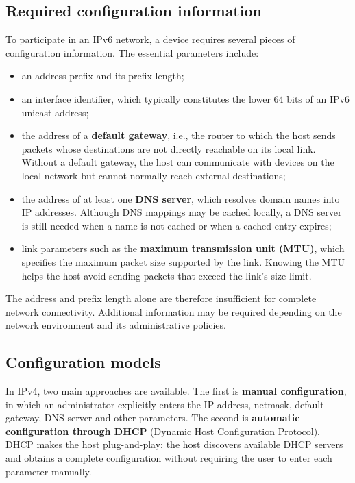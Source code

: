 \documentclass[11pt,a4paper,openany]{report}
\begin{document}
\subsection{Required configuration information}

To participate in an IPv6 network, a device requires several pieces of
configuration information. The essential parameters include:

\begin{itemize}
	\item an address prefix and its prefix length;
	\item an interface identifier, which typically constitutes the lower
	64 bits of an IPv6 unicast address;
	\item the address of a \textbf{default gateway}, i.e., the router to which
	the host sends packets whose destinations are not directly reachable
	on its local link. Without a default gateway, the host can communicate
	with devices on the local network but cannot normally reach external
	destinations;
	\item the address of at least one \textbf{DNS server}, which resolves
	domain names into IP addresses. Although DNS mappings may be cached
	locally, a DNS server is still needed when a name is not cached or
	when a cached entry expires;
	\item link parameters such as the \textbf{maximum transmission unit
		(MTU)}, which specifies the maximum packet size supported by the link.
	Knowing the MTU helps the host avoid sending packets that exceed the
	link's size limit.
\end{itemize}

The address and prefix length alone are therefore insufficient for
complete network connectivity. Additional information may be required
depending on the network environment and its administrative policies.


\subsection{Configuration models}

In IPv4, two main approaches are available. The first is
\textbf{manual configuration}, in which an administrator explicitly
enters the IP address, netmask, default gateway, DNS server and other
parameters. The second is \textbf{automatic configuration through
	DHCP} (Dynamic Host Configuration Protocol). DHCP makes the host
plug-and-play: the host discovers available DHCP servers and obtains
a complete configuration without requiring the user to enter each
parameter manually.
\end{document}
